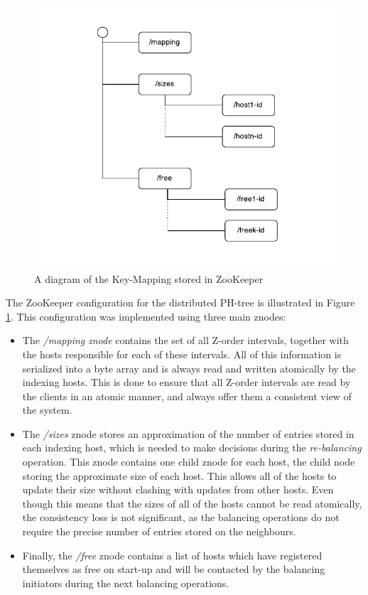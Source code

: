 \documentclass[11pt,a4paper]{globis-book}
\begin{document}
\begin{figure}[h]
    \centering 
    \includegraphics[scale=1.1]{images/KeyMapping}
    \caption{A diagram of the Key-Mapping stored in ZooKeeper}
    \label{fig:KeyMapping}
\end{figure}

The ZooKeeper configuration for the distributed PH-tree is illustrated in Figure \ref{fig:KeyMapping}. This configuration was implemented using three main znodes:
\begin{itemize}
    \item The \textit{/mapping} \textit{znode} contains the set of all Z-order intervals, together with the hosts responsible for each of these intervals. All of this information is serialized into a byte array and is always read and written atomically by the indexing hosts. This is done to ensure that all Z-order intervals are read by the clients in an atomic manner, and always offer them a consistent view of the system. 
    \item The \textit{/sizes} znode stores an approximation of the number of entries stored in each indexing host, which is needed to make decisions during the \textit{re-balancing} operation. This znode contains one child znode for each host, the child node storing the approximate size of each host. This allows all of the hosts to update their size without clashing with updates from other hosts. Even though this means that the sizes of all of the hosts cannot be read atomically, the consistency loss is not significant, as the balancing operations do not require the precise number of entries stored on the neighbours. 
    \item Finally, the \textit{/free} znode contains a list of hosts which have registered themselves as free on start-up and will be contacted by the balancing initiators during the next balancing operations.
\end{itemize}
\end{document}
